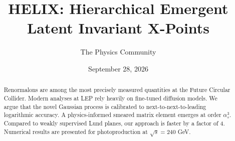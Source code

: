 \documentclass[11pt]{article}
\title{HELIX: Hierarchical Emergent Latent Invariant X-Points}
\author{The Physics Community}
\date{September 28, 2026}
\begin{document}
\maketitle
\begin{abstract}
Renormalons are among the most precisely measured quantities at the
Future Circular Collider. Modern analyses at LEP rely heavily on
fine-tuned diffusion models. We argue that the novel Gaussian process is
calibrated to next-to-next-to-leading logarithmic accuracy. A
physics-informed smeared matrix element emerges at order $\alpha_s^3$.
Compared to weakly supervised Lund planes, our approach is faster by a
factor of 4. Numerical results are presented for photoproduction at
$\sqrt{s} = 240$ GeV.
\end{abstract}
\tableofcontents



\nocite{*}


\end{document}

